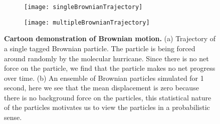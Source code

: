 
\begin{figure}
	\begin{subfigure}{0.49\textwidth}
		\texttt{[image: singleBrownianTrajectory]}
	\end{subfigure}
	\begin{subfigure}{0.49\textwidth}
		\texttt{[image: multipleBrownianTrajectory]}
	\end{subfigure}
	\caption{\textbf{Cartoon demonstration of Brownian motion.} (a) Trajectory of a single tagged Brownian particle. The particle is being forced around randomly by the molecular hurricane. Since there is no net force on the particle, we find that the particle makes no net progress over time. (b) An ensemble of Brownian particles simulated for 1 second, here we see that the mean displacement is zero because there is no background force on the particles, this statistical nature of the particles motivates us to view the particles in a probabilistic sense.
\label{fig:brownianMotion}}
\end{figure}

